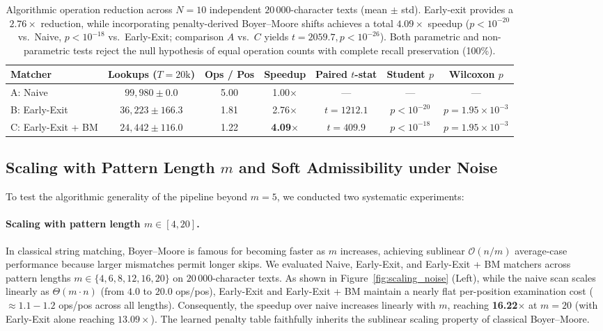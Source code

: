 \documentclass[11pt,a4paper]{article}
\begin{document}
\begin{table}[t]
\centering
\small
\begin{tabular}{@{}l c c c c c c@{}}
\toprule
Matcher & Lookups ($T=20\text{k}$) & Ops / Pos & Speedup & Paired $t$-stat & Student $p$ & Wilcoxon $p$ \\
\midrule
A: Naive & $99,980 \pm 0.0$ & 5.00 & 1.00\(\times\) & --- & --- & --- \\
B: Early-Exit & $36,223 \pm 166.3$ & 1.81 & 2.76\(\times\) & $t = 1212.1$ & $p < 10^{-20}$ & $p = 1.95 \times 10^{-3}$ \\
C: Early-Exit + BM & $24,442 \pm 116.0$ & 1.22 & \textbf{4.09\(\times\)} & $t = 409.9$ & $p < 10^{-18}$ & $p = 1.95 \times 10^{-3}$ \\
\bottomrule
\end{tabular}
\caption{Algorithmic operation reduction across $N=10$ independent $20\,000$-character texts (mean $\pm$ std). Early-exit provides a $2.76\times$ reduction, while incorporating penalty-derived Boyer--Moore shifts achieves a total $4.09\times$ speedup ($p < 10^{-20}$ vs.\ Naive, $p < 10^{-18}$ vs.\ Early-Exit; comparison $A$ vs.\ $C$ yields $t=2059.7, p < 10^{-26}$). Both parametric and non-parametric tests reject the null hypothesis of equal operation counts with complete recall preservation (100\%).}
\label{tab:statistical_claim3}
\end{table}

\subsection{Scaling with Pattern Length \texorpdfstring{$m$}{m} and Soft Admissibility under Noise}
\label{sec:scaling_noise}

To test the algorithmic generality of the pipeline beyond $m=5$, we conducted two systematic experiments:

\paragraph{Scaling with pattern length $m \in [4, 20]$.}
In classical string matching, Boyer--Moore is famous for becoming faster as $m$ increases, achieving sublinear $\mathcal{O}(n/m)$ average-case performance because larger mismatches permit longer skips. We evaluated Naive, Early-Exit, and Early-Exit + BM matchers across pattern lengths $m \in \{4, 6, 8, 12, 16, 20\}$ on $20\,000$-character texts.
As shown in Figure~\ref{fig:scaling_noise} (Left), while the naive scan scales linearly as $\Theta(m \cdot n)$ (from $4.0$ to $20.0$ ops/pos), Early-Exit and Early-Exit + BM maintain a nearly flat per-position examination cost ($\approx 1.1 - 1.2$ ops/pos across all lengths). Consequently, the speedup over naive increases linearly with $m$, reaching \textbf{16.22\(\times\)} at $m=20$ (with Early-Exit alone reaching $13.09\times$). The learned penalty table faithfully inherits the sublinear scaling property of classical Boyer--Moore.
\end{document}
